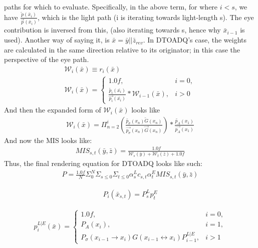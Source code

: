 \message{ !name(test.tex)}\documentclass{article}
\begin{document}
paths for which to evaluate. Specifically, in the above term, for where $i < s$,
we have $\frac{\overleftarrow{p}(\bar{x}_i)}{\overrightarrow{p}(\bar{x}_i)}$,
which is the light path (i is iterating towards light-length s). The eye
contribution is inversed from this, (also iterating towards s, hence why
$\bar{x}_{i-1}$ is used). Another way of saying it, is $\bar{x} = \bar{y} ||
\bar{z}_{rev}$. In DTOADQ's case, the weights are calculated in the same
direction relative to its originator; in this case the perspective of the eye
path.
  \begin{align}
    \mathcal{W}_i(\bar{x}) \equiv r_i(\bar{x})\\
    \mathcal{W}_i (\bar{x}) = 
    \begin{cases}
      1.0f, & i = 0,\\
      \frac{\overleftarrow{p_i}(\bar{x_i})}{\overrightarrow{p_i}(\bar{x_i})} *
      \mathcal{W}_{i-1}(\bar{x}), & i > 0
    \end{cases}
  \end{align}
    And then the expanded form of $\mathcal{W}_i(\bar{x})$ looks like
  \begin{align}
    \mathcal{W}_i(\bar{x}) = \Pi_{n=2}^i(\frac{\overleftarrow
    {p_{\sigma}}(x_n)\overleftarrow {G}(x_n)}
    {\overrightarrow{p_{\sigma}}(x_n)\overrightarrow{G}(x_n)})
    * \frac{\overleftarrow{p_A}(x_1)}{\overrightarrow{p_A}(x_1)}
  \end{align}
    And now the MIS looks like:
  \begin{align}
    MIS_{s, t}(\bar{y}, \bar{z}) =
    \frac{1.0f}{\mathcal{W}_s(\bar{y}) + \mathcal{W}_t(\bar{z}) + 1.0f}
  \end{align}
    Thus, the final rendering equation for DTOADQ looks like such:
  \begin{align}
    P = \frac{1.0f}{N} \Sigma_{0}^{N} \Sigma_{s \le 0} \Sigma_{t \le 0}
    \alpha^L_s c_{s,t} \alpha^E_t MIS_{s, t}(\bar{y}, \bar{z})
  \end{align}


  \begin{align}
    P_i(\bar{x}_{s, t}) = P^L_s p^E_t
  \end{align}

  \begin{align}
    p^{L|E}_i(\bar{x}) =
    \begin{cases}
      1.0f, & i = 0,\\
      P_A(x_i), & i = 1,\\
      P_{\sigma}(x_{i-1} \rightarrow x_i) G(x_{i-1} \leftrightarrow x_i)
      P^{L|E}_{i-1}, & i > 1
    \end{cases}
  \end{align}
\end{document}
